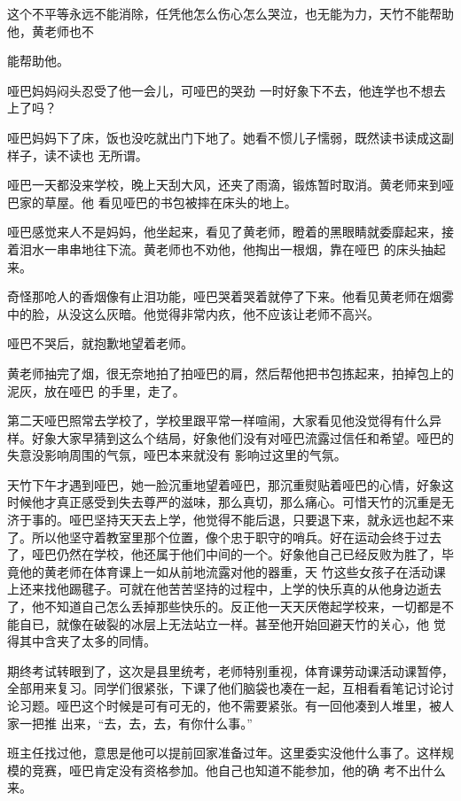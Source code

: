\documentclass{article}
\begin{document}
这个不平等永远不能消除，任凭他怎么伤心怎么哭泣，也无能为力，天竹不能帮助他，黄老师也不
\newpage

能帮助他。 

哑巴妈妈闷头忍受了他一会儿，可哑巴的哭劲
一时好象下不去，他连学也不想去上了吗？ 

哑巴妈妈下了床，饭也没吃就出门下地了。她看不惯儿子懦弱，既然读书读成这副样子，读不读也
无所谓。 

哑巴一天都没来学校，晚上天刮大风，还夹了雨滴，锻炼暂时取消。黄老师来到哑巴家的草屋。他
看见哑巴的书包被摔在床头的地上。 

哑巴感觉来人不是妈妈，他坐起来，看见了黄老师，瞪着的黑眼睛就委靡起来，接着泪水一串串地往下流。黄老师也不劝他，他掏出一根烟，靠在哑巴
的床头抽起来。 

奇怪那呛人的香烟像有止泪功能，哑巴哭着哭着就停了下来。他看见黄老师在烟雾中的脸，从没这么灰暗。他觉得非常内疚，他不应该让老师不高兴。
\newpage

哑巴不哭后，就抱歉地望着老师。 

黄老师抽完了烟，很无奈地拍了拍哑巴的肩，然后帮他把书包拣起来，拍掉包上的泥灰，放在哑巴
的手里，走了。 

第二天哑巴照常去学校了，学校里跟平常一样喧闹，大家看见他没觉得有什么异样。好象大家早猜到这么个结局，好象他们没有对哑巴流露过信任和希望。哑巴的失意没影响周围的气氛，哑巴本来就没有
影响过这里的气氛。 

天竹下午才遇到哑巴，她一脸沉重地望着哑巴，那沉重熨贴着哑巴的心情，好象这时候他才真正感受到失去尊严的滋味，那么真切，那么痛心。可惜天竹的沉重是无济于事的。哑巴坚持天天去上学，他觉得不能后退，只要退下来，就永远也起不来了。所以他坚守着教室里那个位置，像个忠于职守的哨兵。好在运动会终于过去了，哑巴仍然在学校，他还属于他们中间的一个。好象他自己已经反败为胜了，毕竟他的黄老师在体育课上一如从前地流露对他的器重，天
\newpage
竹这些女孩子在活动课上还来找他踢毽子。可就在他苦苦坚持的过程中，上学的快乐真的从他身边逝去了，他不知道自己怎么丢掉那些快乐的。反正他一天天厌倦起学校来，一切都是不能自已，就像在破裂的冰层上无法站立一样。甚至他开始回避天竹的关心，他
觉得其中含夹了太多的同情。 

期终考试转眼到了，这次是县里统考，老师特别重视，体育课劳动课活动课暂停，全部用来复习。同学们很紧张，下课了他们脑袋也凑在一起，互相看看笔记讨论讨论习题。哑巴这个时候是可有可无的，他不需要紧张。有一回他凑到人堆里，被人家一把推
出来，“去，去，去，有你什么事。” 

班主任找过他，意思是他可以提前回家准备过年。这里委实没他什么事了。这样规模的竞赛，哑巴肯定没有资格参加。他自己也知道不能参加，他的确
考不出什么来。 
\end{document}
